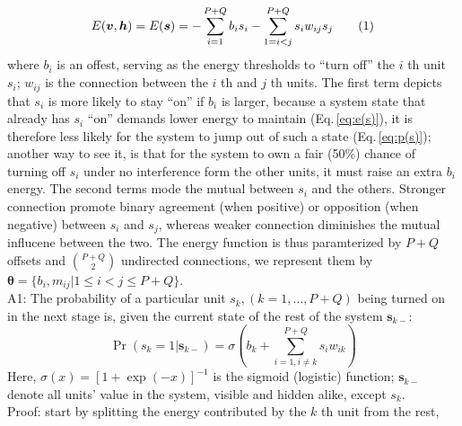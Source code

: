 \documentclass[11pt]{article}
\newcommand\numberthis{\addtocounter{equation}{1}\tag{\theequation}}
\newcommand{\vh}{\boldsymbol{h}}
\newcommand{\vv}{\boldsymbol{v}}
\newcommand{\vs}{\boldsymbol{s}}
\newcommand{\pEC}{\boldsymbol{\theta}}
\begin{document}
\begin{align*}\label{eq:e(s)} %
    E(\vv, \vh) = E(\vs) = -\sum_{i=1}^{P+Q} b_i s_i - \sum_{1 = i < j}^{P+Q} s_i w_{ij} s_j \numberthis
\end{align*}
where $b_i$ is an offest, serving as the energy thresholds to ``turn off'' the $i$ th unit $s_i$; $w_{ij}$ is the connection between the $i$ th and $j$ th units. The first term depicts that $s_i$ is more likely to stay ``on'' if $b_i$ is larger, because a system state that already has $s_i$ ``on'' demands lower energy to maintain (Eq.\,\ref{eq:e(s)}), it is therefore less likely for the system to jump out of such a state (Eq.\,\ref{eq:p(s)}); another way to see it, is that for the system to own a fair (50\%) chance of turning off $s_i$ under no interference form the other units, it must raise an extra $b_i$ energy. The second terms mode the mutual between $s_i$ and the others. Stronger connection promote binary agreement (when positive) or opposition (when negative) between $s_i$ and $s_j$, whereas weaker connection diminishes the mutual influcene between the two. The energy function is thus paramterized by $P+Q$ offsets and $P+Q \choose 2$ undirected connections, we represent them by $\pEC = \{b_i, m_{ij} | 1 \le i < j \le P+Q\}$. \\
A1: The probability of a particular unit $s_k, (k = 1, \dots, P+Q)$ being turned on in the next stage is, given the current state of the rest of the system $\vs_{k-}$:
\begin{equation}\label{eq:p(s_k=1)}
  \Pr(s_k = 1|\vs_{k-}) = \sigma(b_k + \sum_{i=1, i \ne k}^{P+Q}{s_i w_{ik}})
\end{equation}
Here,  $\sigma(x) = [1 + \exp({-x})]^{-1}$ is the sigmoid (logistic) function; $\vs_{k-}$ denote all units' value in the system, visible and hidden alike, except $s_k$. \\
Proof: start by splitting the energy contributed by the $k$ th unit from the rest,
\newcommand{\st}{\tilde{s}}
\end{document}
